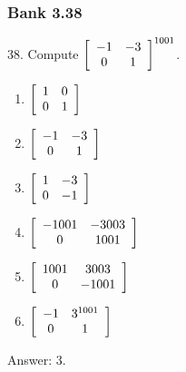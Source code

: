 \documentclass[pdf,9pt,t]{beamer}
\begin{document}
\begin{frame}[fragile]
    \frametitle{Bank 3.38}
    \begin{problem}
	38. Compute $\left[
	    \begin{array}[c]{cc}
		-1 &  -3\\
		0  &  1
	    \end{array}
	    \right]^{1001}$.
	\begin{enumerate}
	    \item  $\left[
		\begin{array}[c]{cc}
		    1 &  0\\
		    0 &  1
		\end{array}
		\right]$
	    \item  $\left[
		\begin{array}[c]{cc}
		    -1 &  -3\\
		    0  &  1
		\end{array}
		\right]$
	    \item $\left[
		\begin{array}[c]{cc}
		    1 &  -3\\
		    0 &  -1
		\end{array}
		\right]$
	    \item  $\left[
		\begin{array}[c]{cc}
		    -1001 &  -3003\\
		    0     &  1001
		\end{array}
		\right]$
	    \item  $\left[
		\begin{array}[c]{cc}
		    1001 &  3003\\
		    0    &  -1001
		\end{array}
		\right]$
	    \item  $\left[
		\begin{array}[c]{cc}
		    -1 &  3_{{}}^{1001}\\
		    0  &  1
		\end{array}
		\right]$
	\end{enumerate}
    \end{problem}
    \pause
    Answer: 3.

\end{frame}
\end{document}
